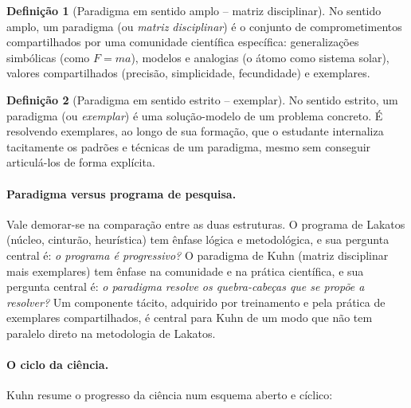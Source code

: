\documentclass[9pt,a4paper]{extarticle}
\theoremstyle{definition}
\newtheorem{definition}{Definição}[section]
\begin{document}
\begin{definition}[Paradigma em sentido amplo -- matriz disciplinar]
No sentido amplo, um paradigma (ou \emph{matriz disciplinar}) é o conjunto de comprometimentos compartilhados por uma comunidade científica específica: generalizações simbólicas (como $F=ma$), modelos e analogias (o átomo como sistema solar), valores compartilhados (precisão, simplicidade, fecundidade) e exemplares.
\end{definition}

\begin{definition}[Paradigma em sentido estrito -- exemplar]
No sentido estrito, um paradigma (ou \emph{exemplar}) é uma solução-modelo de um problema concreto. É resolvendo exemplares, ao longo de sua formação, que o estudante internaliza tacitamente os padrões e técnicas de um paradigma, mesmo sem conseguir articulá-los de forma explícita.
\end{definition}

\paragraph{Paradigma versus programa de pesquisa.}
Vale demorar-se na comparação entre as duas estruturas. O programa de Lakatos (núcleo, cinturão, heurística) tem ênfase lógica e metodológica, e sua pergunta central é: \emph{o programa é progressivo?} O paradigma de Kuhn (matriz disciplinar mais exemplares) tem ênfase na comunidade e na prática científica, e sua pergunta central é: \emph{o paradigma resolve os quebra-cabeças que se propõe a resolver?} Um componente tácito, adquirido por treinamento e pela prática de exemplares compartilhados, é central para Kuhn de um modo que não tem paralelo direto na metodologia de Lakatos.

\paragraph{O ciclo da ciência.}
Kuhn resume o progresso da ciência num esquema aberto e cíclico:

\begin{center}
\end{center}
\end{document}
